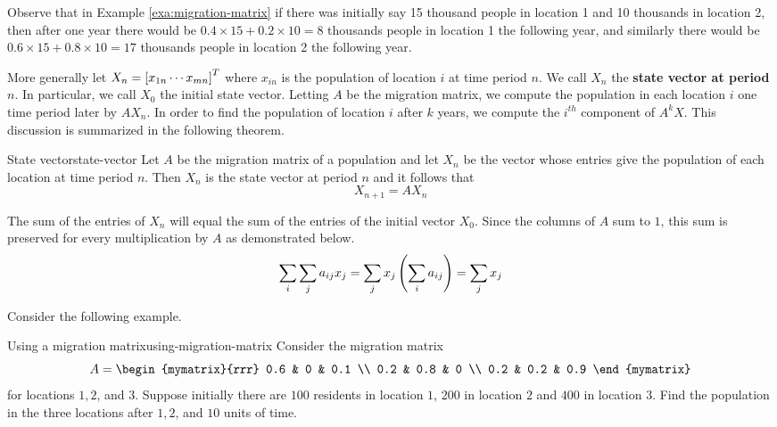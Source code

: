 Observe that in Example \ref{exa:migration-matrix} if there was initially say 15
thousand people in location 1 and 10 thousands in location 2, then
after one year there would be $0.4 \times 15 + 0.2 \times 10 = 8$
thousands people in location 1 the following year, and similarly 
there would be $0.6 \times 15 + 0.8 \times 10 = 17$
thousands people in location 2 the following year.

More generally let $X_n=\left[x_{1n} \cdots x_{mn}\right] ^{T}$ where $x_{in}$ is the
population of location $i$ at time period $n$. We call $X_n$ the \textbf{state vector at period $n$}. In particular, we call $X_0$ the initial state vector. Letting $A$ be the migration matrix, we compute the population in each location $i$ one time period later by $AX_n$. In order to find the population of location $i$ after $k$
years, we compute the $i^{th}$ component of $A^{k}X$. This discussion is summarized in the following theorem. 

\begin{theorem}{State vector}{state-vector}
Let $A$ be the migration matrix of a population and let $X_n$ be the vector whose entries give the population of each location at time period $n$. Then $X_n$ is the state vector at period $n$ and it follows that 
\[
X_{n+1} = A X_n
\]
\end{theorem}

The sum of the entries of $X_n$ will equal the sum of the entries of the initial
vector $X_{0}$. Since the columns of $A$ sum to $1$, this sum is preserved for every
multiplication by $A$ as demonstrated below. 
\begin{equation*}
\sum_{i}\sum_{j}a_{ij}x_{j}=\sum_{j}x_{j}\left(\sum_{i}a_{ij}\right)
=\sum_{j}x_{j}
\end{equation*}

Consider the following example.

\begin{example}{Using a migration matrix}{using-migration-matrix}
Consider the migration matrix 
\begin{equation*}
A = 
\begin{mymatrix}{rrr}
0.6 & 0 & 0.1 \\
0.2 & 0.8 & 0 \\
0.2 & 0.2 & 0.9
\end{mymatrix} 
\end{equation*}
 for locations $1,2$, and $3$. Suppose initially there are $100$
residents in location $1$, $200$ in location $2$ and $400$ in location $3$. Find the
population in the three locations after $1,2$, and $10$ units of time.
\end{example}

